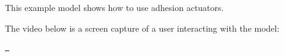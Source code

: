 This example model shows how to use adhesion actuators.

The video below is a screen capture of a user interacting with the model\+:

\href{https://www.youtube.com/watch?v=BcHZ5BFeTmU}{\texttt{ }} 